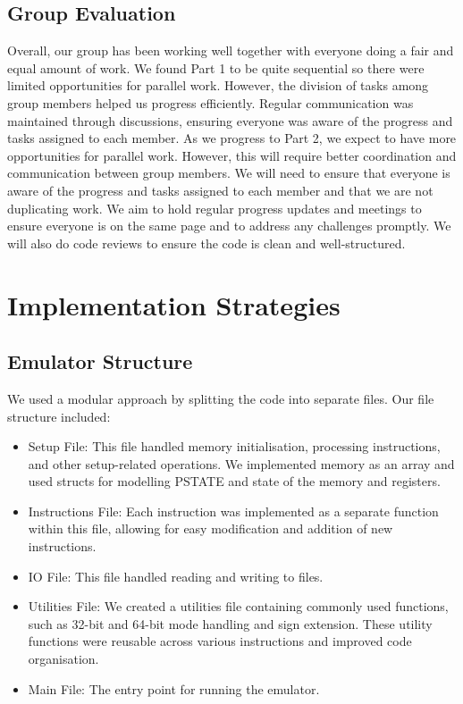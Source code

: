 \documentclass[11pt]{article}
\begin{document}
\subsection*{Group Evaluation}
Overall, our group has been working well together with everyone doing a fair and equal amount of work. We found Part 1 to be quite sequential so there were limited 
opportunities for parallel work. However, the division of tasks among group members helped us progress efficiently. Regular communication was maintained through 
discussions, ensuring everyone was aware of the progress and tasks assigned to each member.
\newline
As we progress to Part 2, we expect to have more opportunities for parallel work. However, this will require better coordination and communication between group members. 
We will need to ensure that everyone is aware of the progress and tasks assigned to each member and that we are not duplicating work. We aim to hold 
regular progress updates and meetings to ensure everyone is on the same page and to address any challenges promptly. We will also do code reviews to ensure the code 
is clean and well-structured.

\section{Implementation Strategies}

\subsection*{Emulator Structure}

We used a modular approach by splitting the code into separate files. Our file structure included:
\begin{itemize}
    \item Setup File: This file handled memory initialisation, processing instructions, and other setup-related operations. 
        We implemented memory as an array and used structs for modelling PSTATE and state of the memory and registers.
    \item Instructions File: Each instruction was implemented as a separate function within this file, allowing for easy 
        modification and addition of new instructions.
    \item IO File: This file handled reading and writing to files.
    \item Utilities File: We created a utilities file containing commonly used functions, such as 32-bit and 64-bit mode handling 
        and sign extension. These utility functions were reusable across various instructions and improved code organisation.
    \item Main File: The entry point for running the emulator.
\end{itemize}
\end{document}
